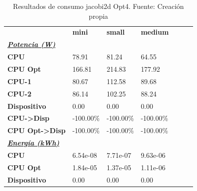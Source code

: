 \begin{table}[H]
    \centering
    \begin{tabular}{lllllll}
    \rowcolor[HTML]{DAE8FC} \ & \textbf{mini} & \textbf{	small} & \textbf{	medium} \\
    \cellcolor[HTML]{DAE8FC} \textbf{\textbf{{\emph{{\underline{{Potencia (W)}}}}}}} &  & 	 & 	 \\
    \rowcolor[HTML]{EFEFEF} \cellcolor[HTML]{DAE8FC} \textbf{CPU} & 78.91 & 	81.24 & 	64.55 \\
    \cellcolor[HTML]{DAE8FC} \textbf{CPU Opt} & 166.81 & 	214.83 & 	177.92 \\
    \rowcolor[HTML]{EFEFEF} \cellcolor[HTML]{DAE8FC} \textbf{\quad CPU-1} & 80.67 & 	112.58 & 	89.68 \\
    \cellcolor[HTML]{DAE8FC} \textbf{\quad CPU-2} & 86.14 & 	102.25 & 	88.24 \\
    \rowcolor[HTML]{EFEFEF} \cellcolor[HTML]{DAE8FC} \textbf{Dispositivo} & 0.00 & 	0.00 & 	0.00 \\
    \cellcolor[HTML]{DAE8FC} \textbf{CPU->Disp} & -100.00\% & 	-100.00\% & 	-100.00\% \\
    \rowcolor[HTML]{EFEFEF} \cellcolor[HTML]{DAE8FC} \textbf{CPU Opt->Disp} & -100.00\% & 	-100.00\% & 	-100.00\% \\
    \cellcolor[HTML]{DAE8FC} \textbf{\textbf{{\emph{{\underline{{Energía (kWh)}}}}}}} &  & 	 & 	 \\
    \rowcolor[HTML]{EFEFEF} \cellcolor[HTML]{DAE8FC} \textbf{CPU} & 6.54e-08 & 	7.71e-07 & 	9.63e-06 \\
    \cellcolor[HTML]{DAE8FC} \textbf{CPU Opt} & 1.84e-05 & 	1.37e-05 & 	1.11e-06 \\
    \rowcolor[HTML]{EFEFEF} \cellcolor[HTML]{DAE8FC} \textbf{Dispositivo} & 0.00 & 	0.00 & 	0.00 \\
    \end{tabular}
    \caption[Resultados de consumo jacobi2d Opt4]{{Resultados de consumo jacobi2d Opt4. Fuente: Creación propia}}
    \label{table_test_jacobi2d_Opt4_hw_powerResults}
\end{table}